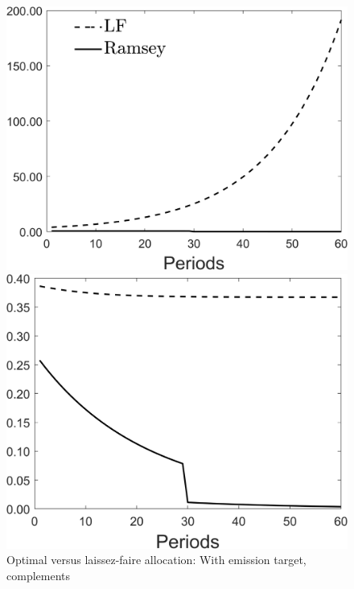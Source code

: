 \begin{figure}[h!!]
	\centering
	\caption{Optimal versus laissez-faire allocation: With emission target, complements }\label{fig:optallo_comp_target}
	\begin{minipage}[]{0.32\textwidth}
		\includegraphics[width=1\textwidth]{../codding_model/Own/figures/Rep_agent/staticRam_LF_separate_c_periods59_eppsilon0.40_zeta1.40_Ad08_Ac04_thetac0.70_thetad0.56_HetGrowth1_tauul0.181_util0_withtarget1_lgd1.png}
	\end{minipage}
	\begin{minipage}[]{0.32\textwidth}
		\includegraphics[width=1\textwidth]{../codding_model/Own/figures/Rep_agent/staticRam_LF_separate_hh_periods59_eppsilon0.40_zeta1.40_Ad08_Ac04_thetac0.70_thetad0.56_HetGrowth1_tauul0.181_util0_withtarget1_lgd0.png}

\end{minipage}
\end{figure}
